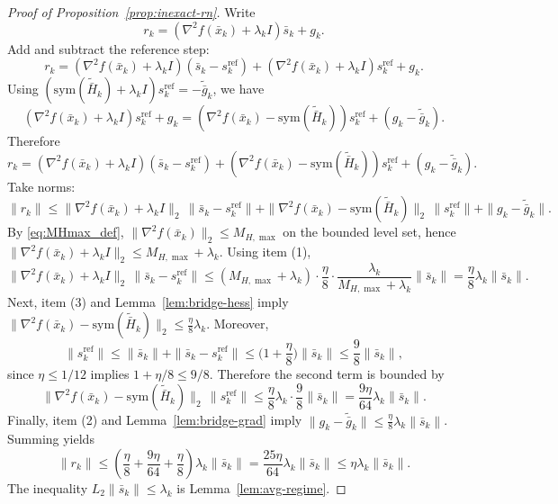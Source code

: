\documentclass[11pt,a4paper]{article}
\begin{document}
\begin{proof}[Proof of Proposition~\ref{prop:inexact-rn}]
Write
\[
r_k=(\nabla^2 f(\bar x_k)+\lambda_k I)\bar s_k+g_k.
\]
Add and subtract the reference step:
\[
r_k=(\nabla^2 f(\bar x_k)+\lambda_k I)(\bar s_k-s_k^{\mathrm{ref}})
+(\nabla^2 f(\bar x_k)+\lambda_k I)s_k^{\mathrm{ref}}+g_k.
\]
Using $(\mathrm{sym}(\tilde{\bar H}_k)+\lambda_k I)s_k^{\mathrm{ref}}=-\tilde{\bar g}_k$, we have
\[
(\nabla^2 f(\bar x_k)+\lambda_k I)s_k^{\mathrm{ref}}+g_k
=(\nabla^2 f(\bar x_k)-\mathrm{sym}(\tilde{\bar H}_k))s_k^{\mathrm{ref}}+(g_k-\tilde{\bar g}_k).
\]
Therefore
\[
r_k=(\nabla^2 f(\bar x_k)+\lambda_k I)(\bar s_k-s_k^{\mathrm{ref}})
+(\nabla^2 f(\bar x_k)-\mathrm{sym}(\tilde{\bar H}_k))s_k^{\mathrm{ref}}+(g_k-\tilde{\bar g}_k).
\]
Take norms:
\[
\|r_k\|
\le \|\nabla^2 f(\bar x_k)+\lambda_k I\|_2\,\|\bar s_k-s_k^{\mathrm{ref}}\|
+\|\nabla^2 f(\bar x_k)-\mathrm{sym}(\tilde{\bar H}_k)\|_2\,\|s_k^{\mathrm{ref}}\|
+\|g_k-\tilde{\bar g}_k\|.
\]
By \eqref{eq:MHmax_def}, $\|\nabla^2 f(\bar x_k)\|_2\le M_{H,\max}$ on the bounded level set, hence
$\|\nabla^2 f(\bar x_k)+\lambda_k I\|_2\le M_{H,\max}+\lambda_k$.
Using item (1),
\[
\|\nabla^2 f(\bar x_k)+\lambda_k I\|_2\,\|\bar s_k-s_k^{\mathrm{ref}}\|
\le (M_{H,\max}+\lambda_k)\cdot \frac{\eta}{8}\cdot \frac{\lambda_k}{M_{H,\max}+\lambda_k}\|\bar s_k\|
=\frac{\eta}{8}\lambda_k\|\bar s_k\|.
\]
Next, item (3) and Lemma~\ref{lem:bridge-hess} imply
$\|\nabla^2 f(\bar x_k)-\mathrm{sym}(\tilde{\bar H}_k)\|_2\le \frac{\eta}{8}\lambda_k$.
Moreover,
\[
\|s_k^{\mathrm{ref}}\|\le \|\bar s_k\|+\|\bar s_k-s_k^{\mathrm{ref}}\|
\le \Big(1+\frac{\eta}{8}\Big)\|\bar s_k\|\le \frac98\|\bar s_k\|,
\]
since $\eta\le 1/12$ implies $1+\eta/8\le 9/8$.
Therefore the second term is bounded by
\[
\|\nabla^2 f(\bar x_k)-\mathrm{sym}(\tilde{\bar H}_k)\|_2\,\|s_k^{\mathrm{ref}}\|
\le \frac{\eta}{8}\lambda_k\cdot \frac98\|\bar s_k\|=\frac{9\eta}{64}\lambda_k\|\bar s_k\|.
\]
Finally, item (2) and Lemma~\ref{lem:bridge-grad} imply $\|g_k-\tilde{\bar g}_k\|\le \frac{\eta}{8}\lambda_k\|\bar s_k\|$.
Summing yields
\[
\|r_k\|\le \left(\frac{\eta}{8}+\frac{9\eta}{64}+\frac{\eta}{8}\right)\lambda_k\|\bar s_k\|
=\frac{25\eta}{64}\lambda_k\|\bar s_k\|\le \eta\lambda_k\|\bar s_k\|.
\]
The inequality $L_2\|\bar s_k\|\le \lambda_k$ is Lemma~\ref{lem:avg-regime}.
\end{proof}
\end{document}
